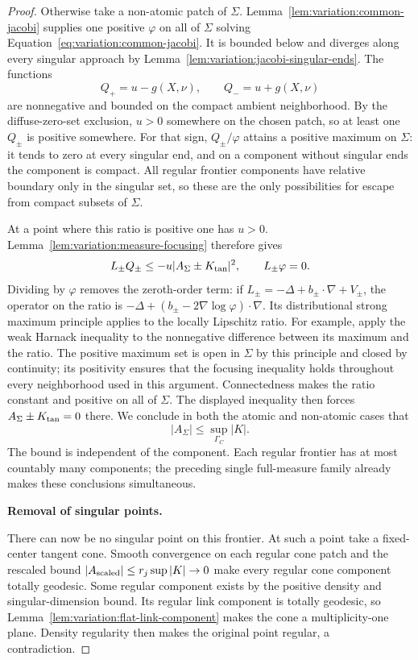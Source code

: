 \begin{proof}
Otherwise take a non-atomic patch of $\Sigma$.
Lemma~\ref{lem:variation:common-jacobi} supplies one positive
$\varphi$ on all of $\Sigma$ solving
Equation~\eqref{eq:variation:common-jacobi}.  It is bounded below and diverges
along every singular approach by
Lemma~\ref{lem:variation:jacobi-singular-ends}.
The functions
\[
 Q_+=u-g(X,\nu),\qquad Q_-=u+g(X,\nu)
\]
are nonnegative and bounded on the compact ambient neighborhood.
By the diffuse-zero-set exclusion, $u>0$ somewhere on the chosen
patch, so at least one $Q_\pm$ is positive somewhere.  For that sign,
$Q_\pm/\varphi$ attains a positive maximum on $\Sigma$: it tends
to zero at every singular end, and on a component without singular
ends the component is compact.  All regular frontier components
have relative boundary only in the singular set, so these are the
only possibilities for escape from compact subsets of $\Sigma$.

At a point where this ratio is positive one has $u>0$.
Lemma~\ref{lem:variation:measure-focusing} therefore gives
\[
 L_\pm Q_\pm\le -u|A_\Sigma\pm K_{\rm tan}|^2,
 \qquad L_\pm\varphi=0.
\]
Dividing by $\varphi$ removes the zeroth-order term: if
$L_\pm=-\Delta+b_\pm\cdot\nabla+V_\pm$, the operator on the
ratio is $-\Delta+(b_\pm-2\nabla\log\varphi)\cdot\nabla$.
Its distributional strong maximum principle applies to the locally
Lipschitz ratio.  For example, apply the weak Harnack inequality to
the nonnegative difference between its maximum and the ratio.
The positive maximum set is open in $\Sigma$ by this principle and
closed by continuity; its positivity ensures that the focusing
inequality holds throughout every neighborhood used in this
argument.  Connectedness makes the ratio constant and positive on
all of $\Sigma$.  The displayed inequality then forces
$A_\Sigma\pm K_{\rm tan}=0$ there.  We conclude in both the atomic
and non-atomic cases that
\begin{equation}\label{eq:variation:curvature-bound}
 |A_\Sigma|\le\sup_{\Gamma_C}|K|.
\end{equation}
The bound is independent of the component.  Each regular frontier
has at most countably many components; the preceding single
full-measure family already makes these conclusions simultaneous.

\smallskip\noindent\textbf{Removal of singular points.}

There can now be no singular point on this frontier.  At such a
point take a fixed-center tangent cone.  Smooth convergence on each
regular cone patch and the rescaled bound
$|A_{\rm scaled}|\le r_j\sup|K|\to0$ make every regular cone
component totally geodesic.  Some regular component exists by the
positive density and singular-dimension bound.  Its regular link
component is totally geodesic, so
Lemma~\ref{lem:variation:flat-link-component} makes the cone a
multiplicity-one plane.  Density regularity then makes the original
point regular, a contradiction.


\end{proof}

